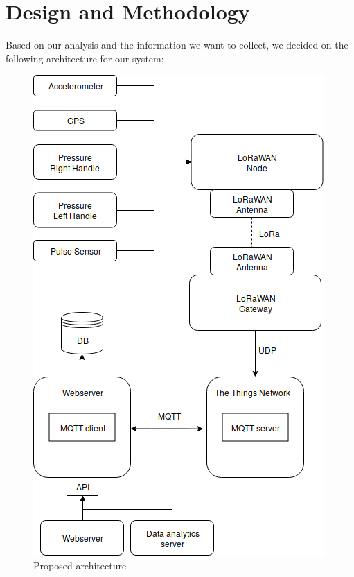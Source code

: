 \chapter{Design and Methodology}
\label{cha:design-and-method}

Based on our analysis and the information we want to collect, we decided on the following architecture for our system:

\begin{figure}[h]
\centering
\includegraphics[width=1\linewidth]{gfx/architecture_design_and_methology_h}
\caption{Proposed architecture}
\label{fig:image1}
\end{figure}

